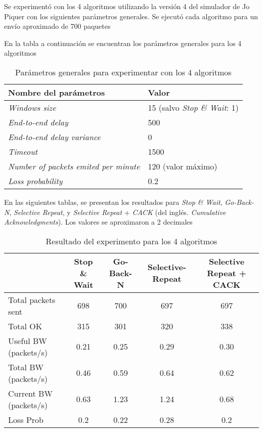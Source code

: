 \documentclass{article}
\begin{document}
Se experimentó con los 4 algoritmos utilizando la versión 4 del simulador de Jo Piquer\cite{simulador_piquer} con los siguientes parámetros generales. Se ejecutó cada algoritmo para un envío aproximado de 700 paquetes

En la tabla a continuación se encuentran los parámetros generales para los 4 algoritmos

\begin{table}
\centering
\caption{Parámetros generales para experimentar con los 4 algoritmos}
\begin{tabular}{ |l|l| } 
 \hline
Nombre del parámetros & Valor\\ \hline
\textit{Windows size} & 15 (salvo \textit{Stop \& Wait}: 1)\\
\textit{End-to-end delay} & 500\\
\textit{End-to-end delay variance} & 0\\
\textit{Timeout} & 1500\\
\textit{Number of packets emited per minute} & 120 (valor máximo)\\
\textit{Loss probability} & 0.2\\ \hline
\end{tabular}
\end{table}

En las siguientes tablas, se presentan los resultados para \textit{Stop \& Wait}, \textit{Go-Back-N}, \textit{Selective Repeat}, y \textit{Selective Repeat} + \textit{CACK} (del inglés. \textit{Cumulative Acknowledgments}). Los valores se aproximaron a 2 decimales

\begin{table}[ht]
\centering
\caption{Resultado del experimento para los 4 algoritmos}
\begin{tabular}[t]{lcccc}
\hline
&Stop \& Wait&Go-Back-N&Selective-Repeat&Selective Repeat + CACK\\
\hline
Total packets sent&        698  & 700 & 697 & 697 \\
Total OK&                         315 & 301 & 320 & 338 \\
Useful BW (packets/s)&    0.21 & 0.25 & 0.29 & 0.30 \\
Total BW (packets/s)&      0.46 & 0.59 & 0.64 & 0.62 \\
Current BW (packets/s)&  0.63 & 1.23 & 1.24 & 0.68 \\
Loss Prob&                       0.2  & 0.22 & 0.28  & 0.2 \\
\hline
\end{tabular}
\end{table}
\end{document}
